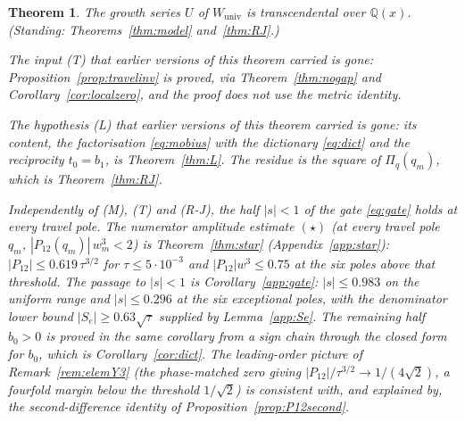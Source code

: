 \documentclass[11pt]{article}
\theoremstyle{plain}
\newtheorem{theorem}{Theorem}
\theoremstyle{definition}
\theoremstyle{remark}
\newcommand{\Q}{\mathbb{Q}}
\begin{document}
\begin{theorem}\label{thm:U}
The growth series $U$ of $W_{\mathrm{univ}}$ is transcendental over $\Q(x)$.
\textup{(}Standing: Theorems~\ref{thm:model} and~\ref{thm:RJ}.\textup{)}

The input \textup{(T)} that earlier versions of this theorem carried is gone:
Proposition~\ref{prop:travelinv} is proved, via Theorem~\ref{thm:nogap} and
Corollary~\ref{cor:localzero}, and the proof does not use the metric identity.

The hypothesis \textup{(L)} that earlier versions of this theorem carried is gone: its content,
the factorisation \eqref{eq:mobius} with the dictionary \eqref{eq:dict} and the reciprocity
$t_0=b_1$, is Theorem~\ref{thm:L}. The residue is the square of $\Pi_q(q_m)$, which is
Theorem~\ref{thm:RJ}.

Independently of \textup{(M)}, \textup{(T)} and \textup{(R-J)}, the half
$|s|<1$ of the gate \eqref{eq:gate} holds at every travel pole. The numerator amplitude estimate
$(\star)$ (at every travel pole
$q_m$, $|P_{12}(q_m)|\,w_m^3<2$) is Theorem~\ref{thm:star} (Appendix~\ref{app:star}):
$|P_{12}|\le0.619\,\tau^{3/2}$ for $\tau\le5\cdot10^{-3}$ and $|P_{12}|w^3\le0.75$ at the six
poles above that threshold. The passage to $|s|<1$ is
Corollary~\ref{app:gate}: $|s|\le0.983$ on the uniform range and $|s|\le0.296$ at the six
exceptional poles, with the denominator lower bound $|S_e|\ge0.63\sqrt\tau$ supplied by
Lemma~\ref{app:Se}. The remaining half $b_0>0$ is proved in the same corollary from a sign chain
through the closed form for $b_0$, which is Corollary~\ref{cor:dict}. The
leading-order picture of Remark~\ref{rem:elemY3} (the phase-matched zero giving
$|P_{12}|/\tau^{3/2}\to1/(4\sqrt2)$, a fourfold margin below the threshold $1/\sqrt2$) is
consistent with, and explained by, the second-difference identity of
Proposition~\ref{prop:P12second}.
\end{theorem}
\end{document}
